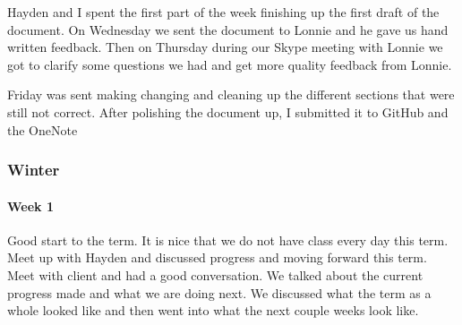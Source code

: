 \documentclass[draftclsnofoot, onecolumn, compsoc, 10pt]{IEEEtran}
\begin{document}
Hayden and I spent the first part of the week finishing up the first draft of the document. On Wednesday we sent the document to Lonnie and he gave us hand written feedback. Then on Thursday during our Skype meeting with Lonnie we got to clarify some questions we had and get more quality feedback from Lonnie. 

Friday was sent making changing and cleaning up the different sections that were still not correct. After polishing the document up, I submitted it to GitHub and the OneNote
\subsubsection{Winter}
\paragraph{Week 1}
Good start to the term. It is nice that we do not have class every day this term. 
Meet up with Hayden and discussed progress and moving forward this term.  
Meet with client and had a good conversation. We talked about the current progress made and what we are doing next. We discussed what the term as a whole looked like and then went into what the next couple weeks look like. 
\end{document}
